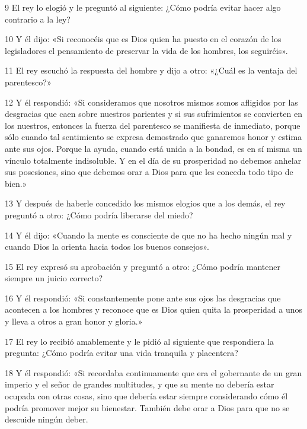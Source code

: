 \par 9 El rey lo elogió y le preguntó al siguiente: ¿Cómo podría evitar hacer algo contrario a la ley?

\par 10 Y él dijo: «Si reconocéis que es Dios quien ha puesto en el corazón de los legisladores el pensamiento de preservar la vida de los hombres, los seguiréis».

\par 11 El rey escuchó la respuesta del hombre y dijo a otro: «¿Cuál es la ventaja del parentesco?»

\par 12 Y él respondió: «Si consideramos que nosotros mismos somos afligidos por las desgracias que caen sobre nuestros parientes y si sus sufrimientos se convierten en los nuestros, entonces la fuerza del parentesco se manifiesta de inmediato, porque sólo cuando tal sentimiento se expresa demostrado que ganaremos honor y estima ante sus ojos. Porque la ayuda, cuando está unida a la bondad, es en sí misma un vínculo totalmente indisoluble. Y en el día de su prosperidad no debemos anhelar sus posesiones, sino que debemos orar a Dios para que les conceda todo tipo de bien.»

\par 13 Y después de haberle concedido los mismos elogios que a los demás, el rey preguntó a otro: ¿Cómo podría liberarse del miedo?

\par 14 Y él dijo: «Cuando la mente es consciente de que no ha hecho ningún mal y cuando Dios la orienta hacia todos los buenos consejos».

\par 15 El rey expresó su aprobación y preguntó a otro: ¿Cómo podría mantener siempre un juicio correcto?

\par 16 Y él respondió: «Si constantemente pone ante sus ojos las desgracias que acontecen a los hombres y reconoce que es Dios quien quita la prosperidad a unos y lleva a otros a gran honor y gloria.»

\par 17 El rey lo recibió amablemente y le pidió al siguiente que respondiera la pregunta: ¿Cómo podría evitar una vida tranquila y placentera?

\par 18 Y él respondió: «Si recordaba continuamente que era el gobernante de un gran imperio y el señor de grandes multitudes, y que su mente no debería estar ocupada con otras cosas, sino que debería estar siempre considerando cómo él podría promover mejor su bienestar. También debe orar a Dios para que no se descuide ningún deber.

